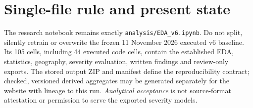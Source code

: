 \documentclass[11pt,a4paper,openany]{report}
\newcommand{\pathcode}[1]{\nolinkurl{#1}}
\begin{document}
\section{Single-file rule and present state}
The research notebook remains exactly \pathcode{analysis/EDA_v6.ipynb}. Do not split, silently retrain or overwrite the frozen 11 November 2026 executed v6 baseline. Its 105 cells, including 44 executed code cells, contain the established EDA, statistics, geography, severity evaluation, written findings and review-only exports. The stored output ZIP and manifest define the reproducibility contract; checked, versioned derived aggregates may be generated separately for the website with lineage to this run. \emph{Analytical acceptance} is not source-format attestation or permission to serve the exported severity models.
\end{document}
